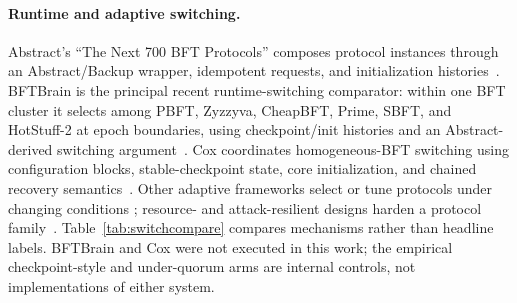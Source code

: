 \documentclass[journal]{IEEEtran}
\theoremstyle{definition}
\theoremstyle{remark}
\begin{document}
\paragraph{Runtime and adaptive switching.}
Abstract's ``The Next 700 BFT Protocols'' composes protocol instances through an Abstract/Backup
wrapper, idempotent requests, and initialization histories~\cite{abstract}. BFTBrain is the principal
recent runtime-switching comparator: within one BFT cluster it selects among PBFT, Zyzzyva,
CheapBFT, Prime, SBFT, and HotStuff-2 at epoch boundaries, using checkpoint/init histories and an
Abstract-derived switching argument~\cite{bftbrain}. Cox coordinates homogeneous-BFT switching using
configuration blocks, stable-checkpoint state, core initialization, and chained recovery
semantics~\cite{cox}. Other adaptive frameworks select or tune protocols under changing conditions
\cite{spectrum,adapt,aware,dapbft,adachain,adaptbft,threatadapt,adacon}; resource- and attack-resilient
designs harden a protocol family~\cite{rebft,prime,aardvark,rbft}. Table~\ref{tab:switchcompare}
compares mechanisms rather than headline labels. BFTBrain and Cox were not executed in this work;
the empirical checkpoint-style and under-quorum arms are internal controls, not implementations of
either system.
\end{document}
